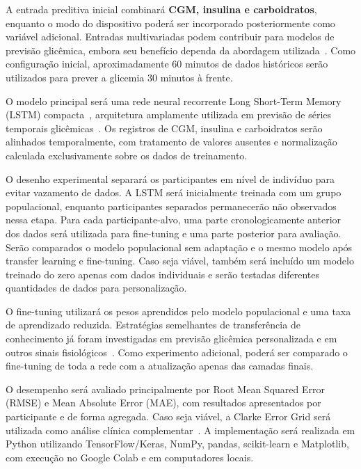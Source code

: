 \documentclass[conference]{IEEEtran}
\begin{document}
A entrada preditiva inicial combinará \textbf{CGM, insulina e carboidratos}, enquanto o modo do dispositivo poderá ser incorporado posteriormente como variável adicional. Entradas multivariadas podem contribuir para modelos de previsão glicêmica, embora seu benefício dependa da abordagem utilizada~\cite{nemat2024comparative}. Como configuração inicial, aproximadamente 60 minutos de dados históricos serão utilizados para prever a glicemia 30 minutos à frente.

O modelo principal será uma rede neural recorrente Long Short-Term Memory (LSTM) compacta~\cite{hochreiter1997lstm}, arquitetura amplamente utilizada em previsão de séries temporais glicêmicas~\cite{khadem2026ai}. Os registros de CGM, insulina e carboidratos serão alinhados temporalmente, com tratamento de valores ausentes e normalização calculada exclusivamente sobre os dados de treinamento.

O desenho experimental separará os participantes em nível de indivíduo para evitar vazamento de dados. A LSTM será inicialmente treinada com um grupo populacional, enquanto participantes separados permanecerão não observados nessa etapa. Para cada participante-alvo, uma parte cronologicamente anterior dos dados será utilizada para fine-tuning e uma parte posterior para avaliação. Serão comparados o modelo populacional sem adaptação e o mesmo modelo após transfer learning e fine-tuning. Caso seja viável, também será incluído um modelo treinado do zero apenas com dados individuais e serão testadas diferentes quantidades de dados para personalização.

O fine-tuning utilizará os pesos aprendidos pelo modelo populacional e uma taxa de aprendizado reduzida. Estratégias semelhantes de transferência de conhecimento já foram investigadas em previsão glicêmica personalizada e em outros sinais fisiológicos~\cite{deng2021transfer,shen2025incremental,leitner2022bp}. Como experimento adicional, poderá ser comparado o fine-tuning de toda a rede com a atualização apenas das camadas finais.

O desempenho será avaliado principalmente por Root Mean Squared Error (RMSE) e Mean Absolute Error (MAE), com resultados apresentados por participante e de forma agregada. Caso seja viável, a Clarke Error Grid será utilizada como análise clínica complementar~\cite{clarke1987errorgrid}. A implementação será realizada em Python utilizando TensorFlow/Keras, NumPy, pandas, scikit-learn e Matplotlib, com execução no Google Colab e em computadores locais.
\end{document}

